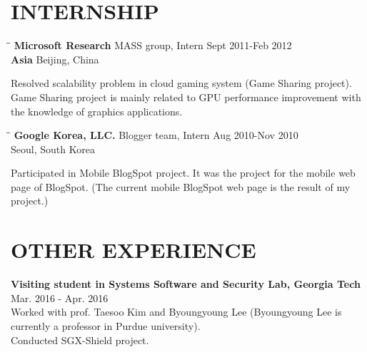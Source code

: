 \section{INTERNSHIP}
   \vspace{0.1in}

   \begin{tabbing}
   \hspace{2.3in}\= \hspace{2.6in}\= \kill %
    \textbf{\large Microsoft Research} \>MASS group, Intern        \>Sept 2011-Feb 2012\\
    \textbf{\large Asia} \>Beijing, China
   \end{tabbing}\vspace{-20pt}
    Resolved scalability problem in cloud gaming system (Game Sharing project).
    Game Sharing project is mainly related to GPU performance improvement with
    the knowledge of graphics applications.

   \begin{tabbing}
   \hspace{2.3in}\= \hspace{2.6in}\= \kill %
    \textbf{\large Google Korea, LLC.} \>Blogger team, Intern     \>Aug 2010-Nov 2010\\
                        \>Seoul, South Korea
   \end{tabbing}\vspace{-20pt}      %
   Participated in Mobile BlogSpot project.
   It was the project for the mobile web page of BlogSpot.
   (The current mobile BlogSpot web page is the result of my project.)




\section{OTHER EXPERIENCE}
   \vspace{0.1in}

    \textbf{Visiting student in Systems Software and Security Lab, Georgia Tech}\\
    Mar. 2016 - Apr. 2016\\
    Worked with prof. Taesoo Kim and Byoungyoung Lee (Byoungyoung Lee is currently
    a professor in Purdue university).\\
    Conducted SGX-Shield project.
